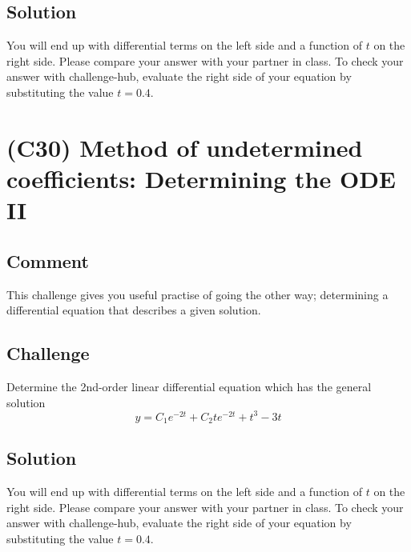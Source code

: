 \subsection*{Solution}
You will end up with differential terms on the left side and a function of $t$ on the right side.
Please compare your answer with your partner in class.
To check your answer with challenge-hub, evaluate the right side of your equation by substituting the value $t=0.4$.




\newpage
\section{(C30) Method of undetermined coefficients: Determining the ODE II}

\subsection*{Comment}
This challenge gives you useful practise of going the other way; determining a differential equation that describes a given solution.

\subsection*{Challenge}
Determine the 2nd-order linear differential equation which has the general solution
\begin{equation}
    y = C_1 e^{-2t} + C_2 t e^{-2t} + t^3 - 3t
\end{equation}

\subsection*{Solution}
You will end up with differential terms on the left side and a function of $t$ on the right side.
Please compare your answer with your partner in class.
To check your answer with challenge-hub, evaluate the right side of your equation by substituting the value $t=0.4$.
